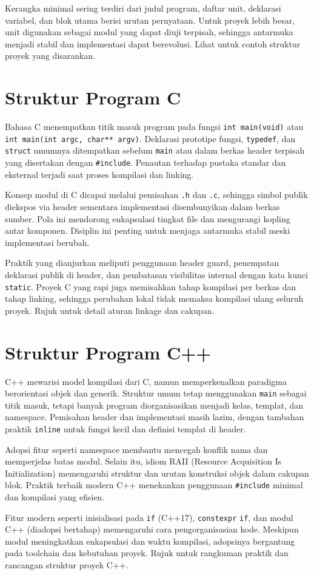 \documentclass[../main.tex]{subfiles}
\begin{document}
Kerangka minimal sering terdiri dari judul program, daftar unit, deklarasi variabel, dan blok utama berisi urutan pernyataan. Untuk proyek lebih besar, unit digunakan sebagai modul yang dapat diuji terpisah, sehingga antarmuka menjadi stabil dan implementasi dapat berevolusi. Lihat \textcite{pascal-tutorial-wikibooks,free-pascal-docs} untuk contoh struktur proyek yang disarankan.

\section{Struktur Program C}
Bahasa C menempatkan titik masuk program pada fungsi \texttt{int main(void)} atau \texttt{int main(int argc, char** argv)}. Deklarasi prototipe fungsi, \texttt{typedef}, dan \texttt{struct} umumnya ditempatkan sebelum \texttt{main} atau dalam berkas header terpisah yang disertakan dengan \texttt{#include}. Penautan terhadap pustaka standar dan eksternal terjadi saat proses kompilasi dan linking.

Konsep modul di C dicapai melalui pemisahan \texttt{.h} dan \texttt{.c}, sehingga simbol publik diekspos via header sementara implementasi disembunyikan dalam berkas sumber. Pola ini mendorong enkapsulasi tingkat file dan mengurangi kopling antar komponen. Disiplin ini penting untuk menjaga antarmuka stabil meski implementasi berubah.

Praktik yang dianjurkan meliputi penggunaan header guard, penempatan deklarasi publik di header, dan pembatasan visibilitas internal dengan kata kunci \texttt{static}. Proyek C yang rapi juga memisahkan tahap kompilasi per berkas dan tahap linking, sehingga perubahan lokal tidak memaksa kompilasi ulang seluruh proyek. Rujuk \textcite{gnu-c-manual,iso-c-draft-n1570} untuk detail aturan linkage dan cakupan.

\section{Struktur Program C++}
C++ mewarisi model kompilasi dari C, namun memperkenalkan paradigma berorientasi objek dan generik. Struktur umum tetap menggunakan \texttt{main} sebagai titik masuk, tetapi banyak program diorganisasikan menjadi kelas, templat, dan namespace. Pemisahan header dan implementasi masih lazim, dengan tambahan praktik \texttt{inline} untuk fungsi kecil dan definisi templat di header.

Adopsi fitur seperti namespace membantu mencegah konflik nama dan memperjelas batas modul. Selain itu, idiom RAII (Resource Acquisition Is Initialization) memengaruhi struktur dan urutan konstruksi objek dalam cakupan blok. Praktik terbaik modern C++ menekankan penggunaan \texttt{#include} minimal dan kompilasi yang efisien.

Fitur modern seperti inisialisasi pada \texttt{if} (C++17), \texttt{constexpr} \texttt{if}, dan modul C++ (diadopsi bertahap) memengaruhi cara pengorganisasian kode. Meskipun modul meningkatkan enkapsulasi dan waktu kompilasi, adopsinya bergantung pada toolchain dan kebutuhan proyek. Rujuk \textcite{cpp-reference} untuk rangkuman praktik dan rancangan struktur proyek C++.
\end{document}
